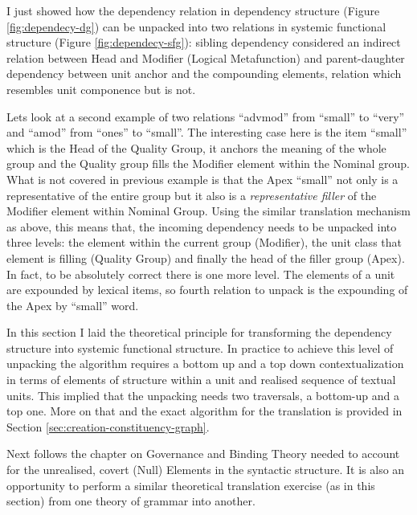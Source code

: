 I just showed how the dependency relation in dependency structure (Figure \ref{fig:dependecy-dg}) can be unpacked into two relations in systemic functional structure (Figure \ref{fig:dependecy-sfg}): sibling dependency considered an indirect relation between Head and Modifier (Logical Metafunction) and parent-daughter dependency between unit anchor and the compounding elements, relation which resembles unit componence but is not. 

Lets look at a second example of two relations ``advmod'' from ``small'' to ``very'' and ``amod'' from ``ones'' to ``small''. The interesting case here is the item ``small'' which is the Head of the Quality Group, it anchors the meaning of the whole group and the Quality group fills the Modifier element within the Nominal group. What is not covered in previous example is that the Apex ``small'' not only is a representative of the entire group but it also is a \textit{representative filler} of the Modifier element within Nominal Group. Using the similar translation mechanism as above, this means that, the incoming dependency needs to be unpacked into three levels: the element within the current group (Modifier), the unit class that element is filling (Quality Group) and finally the head of the filler group (Apex). In fact, to be absolutely correct there is one more level. The elements of a unit are expounded by lexical items, so fourth relation to unpack is the expounding of the Apex by ``small'' word.

In this section I laid the theoretical principle for transforming the dependency structure into systemic functional structure. In practice to achieve this level of unpacking the algorithm requires a bottom up and a top down contextualization in terms of elements of structure within a unit and realised sequence of textual units. This implied that the unpacking needs two traversals, a bottom-up and a top one. More on that and the exact algorithm for the translation is provided in Section \ref{sec:creation-constituency-graph}.

Next follows the chapter on Governance and Binding Theory needed to account for the unrealised, covert (Null) Elements in the syntactic structure. It is also an opportunity to perform a similar theoretical translation exercise (as in this section) from one theory of grammar into another.

%
%
%
